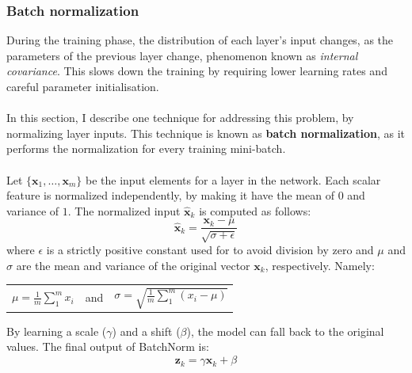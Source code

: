 	\subsubsection{Batch normalization} \label{Section: impl/ml/reg/batch}
	During the training phase, the distribution of each layer's input changes, as the parameters of the previous layer change, phenomenon known as \textit{internal covariance}. This slows down the training by requiring lower learning rates and careful parameter initialisation. 
	\\ \\
	In this section, I describe one technique for addressing this problem, by normalizing layer inputs. This technique is known as \textbf{batch normalization}\cite{DBLP:journals/corr/IoffeS15}, as it performs the normalization for every training mini-batch. 
	\\ \\
	Let $\{ \mathbf{x}_1, \dots, \mathbf{x}_m  \}$ be the input elements for a layer in the network. Each scalar feature is normalized independently, by making it have the mean of $0$ and variance of $1$.  The normalized input $\mathbf{\hat{x}}_k$ is computed as follows:
	\begin{equation}
		\mathbf{\hat{x}}_k = \frac{\mathbf{x}_k - \mu}{\sqrt{\sigma + \epsilon}}
	\end{equation}
	where $\epsilon$ is a strictly positive constant used for to avoid division by zero and $\mu$ and $\sigma$ are the mean and variance of the original vector $\mathbf{x}_k$, respectively. Namely:
	\begin{longtable}{ccc}

				$\mu = \frac{1}{m} \sum_{1}^{m} x_i$

			&   and   &

				$\sigma = \sqrt{\frac{1}{m}\sum_{1}^{m}(x_i - \mu)}$

	\end{longtable}
	By learning a scale ($\gamma$) and a shift ($\beta$), the model can fall back to the original values. The final output of BatchNorm is: 
	\begin{equation}
		\mathbf{z}_k = \gamma \mathbf{\hat{x}}_k + \beta
	\end{equation} 
